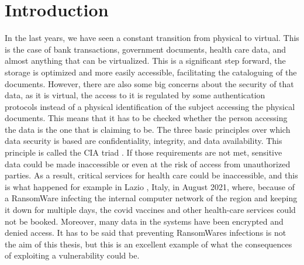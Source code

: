 \chapter{Introduction}
\label{chap:introduction}
In the last years, we have seen a constant transition from physical to virtual. This is the case of bank transactions, government documents, health care data, and almost anything that can be virtualized. This is a significant step forward, the storage is optimized and more easily accessible, facilitating the cataloguing of the documents. However, there are also some big concerns about the security of that data, as it is virtual, the access to it is regulated by some authentication protocols instead of a physical identification of the subject accessing the physical documents. This means that it has to be checked whether the person accessing the data is the one that is claiming to be. The three basic principles over which data security is based are confidentiality, integrity, and data availability. This principle is called the CIA triad \cite{cia_triad}.
If those requirements are not met, sensitive data could be made inaccessible or even at the risk of access from unauthorized parties. As a result, critical services for health care could be inaccessible, and this is what happened for example in Lazio \cite{lazio_hacker_0,lazio_hacker_1}, Italy, in August 2021, where, because of a RansomWare infecting the internal computer network of the region and keeping it down for multiple days, the covid vaccines and other health-care services could not be booked. Moreover, many data in the systems have been encrypted and denied access. It has to be said that preventing RansomWares infections is not the aim of this thesis, but this is an excellent example of what the consequences of exploiting a vulnerability could be. 

